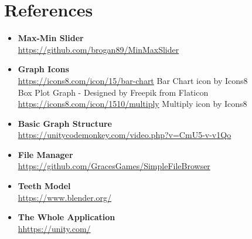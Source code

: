\documentclass[11pt,english, titlepage]{article}
\begin{document}
\section*{References}
  \begin{itemize}
    \item \textbf{Max-Min Slider} \\
    \url{https://github.com/brogan89/MinMaxSlider}
    \item \textbf{Graph Icons} \\
    \url{https://icons8.com/icon/15/bar-chart} Bar Chart icon by Icons8 \\
    Box Plot Graph - Designed by Freepik from Flaticon \\
    \url{https://icons8.com/icon/1510/multiply} Multiply icon by Icons8
    \item \textbf{Basic Graph Structure} \\
    \url{https://unitycodemonkey.com/video.php?v=CmU5-v-v1Qo}
    \item \textbf{File Manager} \\
    \url{https://github.com/GracesGames/SimpleFileBrowser}
    \item \textbf{Teeth Model} \\
    \url{https://www.blender.org/}
    \item \textbf{The Whole Application} \\
    \url{hhttps://unity.com/}
  \end{itemize}
\end{document}

